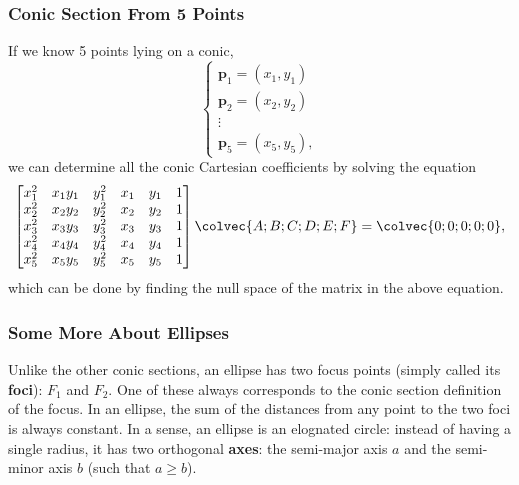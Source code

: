 \subsubsection{Conic Section From 5 Points}
If we know 5 points lying on a conic,
\begin{equation}
  \begin{cases}
    \bm{p}_{1}=\left(x_{1},y_{1}\right)\\
    \bm{p}_{2}=\left(x_{2},y_{2}\right)\\
    \vdots\\
    \bm{p}_{5}=\left(x_{5},y_{5}\right),
  \end{cases}
  \label{eq:5_points_on_conic}
\end{equation}
we can determine all the conic Cartesian coefficients by solving the equation
\begin{equation}
  \begin{bmatrix}
    x_{1}^{2} & x_{1}y_{1} & y_{1}^{2} & x_{1} & y_{1} & 1\\
    x_{2}^{2} & x_{2}y_{2} & y_{2}^{2} & x_{2} & y_{2} & 1\\
    x_{3}^{2} & x_{3}y_{3} & y_{3}^{2} & x_{3} & y_{3} & 1\\
    x_{4}^{2} & x_{4}y_{4} & y_{4}^{2} & x_{4} & y_{4} & 1\\
    x_{5}^{2} & x_{5}y_{5} & y_{5}^{2} & x_{5} & y_{5} & 1
  \end{bmatrix}
  \colvec{A;B;C;D;E;F} = \colvec{0;0;0;0;0},
  \label{eq:5_points_determine_conic_matrix_equation}
\end{equation}
which can be done by finding the null space of the matrix in the above equation.

\subsubsection{Some More About Ellipses}
Unlike the other conic sections, an ellipse has two focus points (simply called its \textbf{foci}): $F_{1}$ and $F_{2}$. One of these always corresponds to the conic section definition of the focus. In an ellipse, the sum of the distances from any point to the two foci is always constant. In a sense, an ellipse is an elognated circle: instead of having a single radius, it has two orthogonal \textbf{axes}: the semi-major axis $a$ and the semi-minor axis $b$ (such that $a\geq b$).

